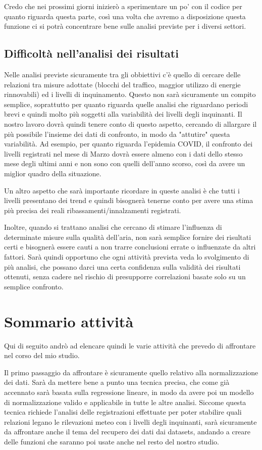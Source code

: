 \documentclass{article}
\begin{document}
Credo che nei prossimi giorni inizierò a sperimentare un po' con il codice per quanto riguarda questa parte, così una volta che avremo a disposizione questa funzione ci si potrà concentrare bene sulle analisi previste per i diversi settori.

\subsection{Difficoltà nell'analisi dei risultati}
Nelle analisi previste sicuramente tra gli obbiettivi c'è quello di cercare delle relazioni tra misure adottate (blocchi del traffico, maggior utilizzo di energie rinnovabili) ed i livelli di inquinamento. Questo non sarà sicuramente un compito semplice, soprattutto per quanto riguarda quelle analisi che riguardano periodi brevi e quindi molto più soggetti alla variabilità dei livelli degli inquinanti. Il nostro lavoro dovrà quindi tenere conto di questo aspetto, cercando di allargare il più possibile l'insieme dei dati di confronto, in modo da "attutire" questa variabilità. Ad esempio, per quanto riguarda l'epidemia COVID, il confronto dei livelli registrati nel mese di Marzo dovrà essere almeno con i dati dello stesso mese degli ultimi anni e non sono con quelli dell'anno scorso, così da avere un miglior quadro della situazione.

Un altro aspetto che sarà importante ricordare in queste analisi è che tutti i livelli presentano dei trend e quindi bisognerà tenerne conto per avere una stima più precisa dei reali ribassamenti/innalzamenti registrati.

Inoltre, quando si trattano analisi che cercano di stimare l'influenza di determinate misure sulla qualità dell'aria, non sarà semplice fornire dei risultati certi e bisognerà essere cauti a non trarre conclusioni errate o influenzate da altri fattori. Sarà quindi opportuno che ogni attività prevista veda lo svolgimento di più analisi, che possano darci una certa confidenza sulla validità dei risultati ottenuti, senza cadere nel rischio di presupporre correlazioni basate solo su un semplice confronto.


\section{Sommario attività}
Qui di seguito andrò ad elencare quindi le varie attività che prevedo di affrontare nel corso del mio studio.

Il primo passaggio da affrontare è sicuramente quello relativo alla normalizzazione dei dati. Sarà da mettere bene a punto una tecnica precisa, che come già accennato sarà basata sulla regressione lineare, in modo da avere poi un modello di normalizzazione valido e applicabile in tutte le altre analisi. Siccome questa tecnica richiede l'analisi delle registrazioni effettuate per poter stabilire quali relazioni legano le rilevazioni meteo con i livelli degli inquinanti, sarà sicuramente da affrontare anche il tema del recupero dei dati dai datasets, andando a creare delle funzioni che saranno poi usate anche nel resto del nostro studio.
\end{document}
